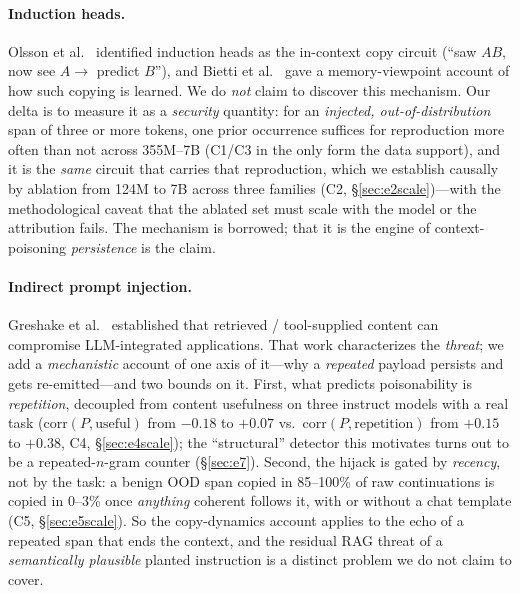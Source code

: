 \documentclass[11pt]{article}
\theoremstyle{plain}
\theoremstyle{definition}
\theoremstyle{remark}
\begin{document}
\paragraph{Induction heads.} Olsson et al.~\cite{olsson2022} identified induction heads as the
in-context copy circuit (``saw $AB$, now see $A\!\to$ predict $B$''), and Bietti et
al.~\cite{bietti2023} gave a memory-viewpoint account of how such copying is learned. We do
\emph{not} claim to discover this mechanism. Our delta is to measure it as a \emph{security}
quantity: for an \emph{injected, out-of-distribution} span of three or more tokens, one prior
occurrence suffices for reproduction more often than not across 355M--7B (C1/C3 in the only
form the data support), and it is the \emph{same} circuit that carries that reproduction, which
we establish causally by ablation from 124M to 7B across three families (C2,
\S\ref{sec:e2scale})---with the methodological caveat that the ablated set must scale with the
model or the attribution fails. The mechanism is borrowed; that it is the engine of
context-poisoning \emph{persistence} is the claim.

\paragraph{Indirect prompt injection.} Greshake et al.~\cite{greshake2023} established that
retrieved / tool-supplied content can compromise LLM-integrated applications. That work
characterizes the \emph{threat}; we add a \emph{mechanistic} account of one axis of it---why a
\emph{repeated} payload persists and gets re-emitted---and two bounds on it. First, what predicts
poisonability is \emph{repetition}, decoupled from content usefulness on three instruct models
with a real task ($\mathrm{corr}(P,\text{useful})$ from $-0.18$ to $+0.07$ vs.\
$\mathrm{corr}(P,\text{repetition})$ from $+0.15$ to $+0.38$, C4, \S\ref{sec:e4scale}); the
``structural'' detector this motivates turns out to be a repeated-$n$-gram counter
(\S\ref{sec:e7}). Second, the hijack is gated by \emph{recency}, not by the task: a benign OOD
span copied in 85--100\% of raw continuations is copied in 0--3\% once \emph{anything} coherent
follows it, with or without a chat template (C5, \S\ref{sec:e5scale}). So the copy-dynamics
account applies to the echo of a repeated span that ends the context, and the residual RAG
threat of a \emph{semantically plausible} planted instruction is a distinct problem we do not
claim to cover.
\end{document}
